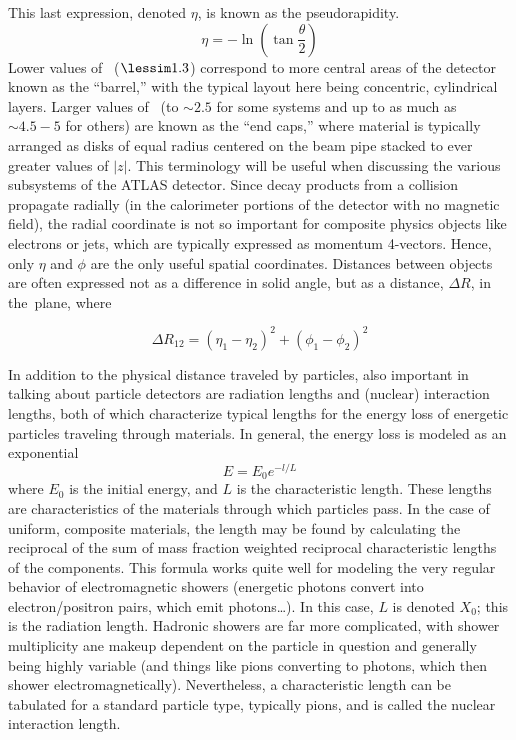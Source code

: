 This last expression, denoted $\eta$, is known as the pseudorapidity.  
\begin{equation}
\eta=-\ln\left(\tan\frac{\theta}{2}\right)
\end{equation}
Lower values of \aeta\, ($\lessim 1.3$) correspond to more central areas of the detector known as the ``barrel,'' with the typical layout here being concentric, cylindrical layers.  Larger values of \aeta\, (to $\sim2.5$ for some systems and up to as much as $\sim 4.5-5$ for others) are known as the ``end caps,'' where material is typically arranged as disks of equal radius centered on the beam pipe stacked to ever greater values of $\left|z\right|$.  This terminology will be useful when discussing the various subsystems of the ATLAS detector.
Since decay products from a collision propagate radially (in the calorimeter portions of the detector with no magnetic field), the radial coordinate is not so important for composite physics objects like electrons or jets, which are typically expressed as momentum 4-vectors.  Hence, only $\eta$ and $\phi$ are the only useful spatial coordinates.  Distances between objects are often expressed not as a difference in solid angle, but as a distance, $\Delta R$, in the \ephi\,plane, where

\begin{equation}
\Delta R_{12} = \left(\eta_1-\eta_2\right)^2+\left(\phi_1-\phi_2\right)^2
\end{equation}

In addition to the physical distance traveled by particles, also important in talking about particle detectors are radiation lengths and (nuclear) interaction lengths, both of which characterize typical lengths for the energy loss of energetic particles traveling through materials.  In general, the energy loss is modeled as an exponential
\begin{equation}
E=E_0e^{-l/L}
\end{equation}
where $E_0$ is the initial energy, and $L$ is the characteristic length.  These lengths are characteristics of the materials through which particles pass.  In the case of uniform, composite materials, the length may be found by calculating the reciprocal of the sum of mass fraction weighted reciprocal characteristic lengths of the components.  This formula works quite well for modeling the very regular behavior of electromagnetic showers (energetic photons convert into electron/positron pairs, which emit photons\ldots).  In this case, $L$ is denoted $X_0$; this is the radiation length.  Hadronic showers are far more complicated, with shower multiplicity ane makeup dependent on the particle in question and generally being highly variable (and things like pions converting to photons, which then shower electromagnetically).  Nevertheless, a characteristic length can be tabulated for a standard particle type, typically pions, and is called the nuclear interaction length.

